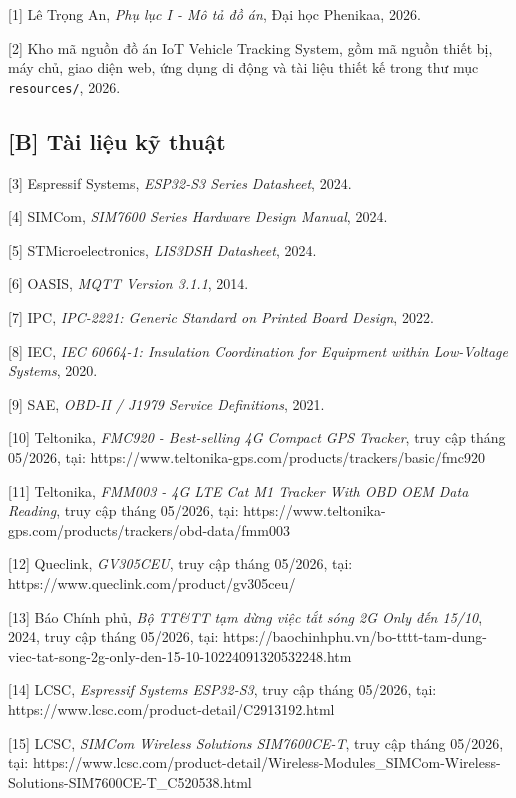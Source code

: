 \documentclass[a4paper]{extarticle}
\begin{document}
{[}1{]} Lê Trọng An, \emph{Phụ lục I - Mô tả đồ án}, Đại học Phenikaa, 2026.

{[}2{]} Kho mã nguồn đồ án IoT Vehicle Tracking System, gồm mã nguồn thiết bị, máy chủ, giao diện web, ứng dụng di động và tài liệu thiết kế trong thư mục \texttt{resources/}, 2026.

\subsection{{[}B{]} Tài liệu kỹ thuật}\label{b-tuxe0i-liux1ec7u-kux1ef9-thuux1eadt}

{[}3{]} Espressif Systems, \emph{ESP32-S3 Series Datasheet}, 2024.

{[}4{]} SIMCom, \emph{SIM7600 Series Hardware Design Manual}, 2024.

{[}5{]} STMicroelectronics, \emph{LIS3DSH Datasheet}, 2024.

{[}6{]} OASIS, \emph{MQTT Version 3.1.1}, 2014.

{[}7{]} IPC, \emph{IPC-2221: Generic Standard on Printed Board Design}, 2022.

{[}8{]} IEC, \emph{IEC 60664-1: Insulation Coordination for Equipment within Low-Voltage Systems}, 2020.

{[}9{]} SAE, \emph{OBD-II / J1979 Service Definitions}, 2021.

{[}10{]} Teltonika, \emph{FMC920 - Best-selling 4G Compact GPS Tracker}, truy cập tháng 05/2026, tại: https://www.teltonika-gps.com/products/trackers/basic/fmc920

{[}11{]} Teltonika, \emph{FMM003 - 4G LTE Cat M1 Tracker With OBD OEM Data Reading}, truy cập tháng 05/2026, tại: https://www.teltonika-gps.com/products/trackers/obd-data/fmm003

{[}12{]} Queclink, \emph{GV305CEU}, truy cập tháng 05/2026, tại: https://www.queclink.com/product/gv305ceu/

{[}13{]} Báo Chính phủ, \emph{Bộ TT\&TT tạm dừng việc tắt sóng 2G Only đến 15/10}, 2024, truy cập tháng 05/2026, tại: https://baochinhphu.vn/bo-tttt-tam-dung-viec-tat-song-2g-only-den-15-10-10224091320532248.htm

{[}14{]} LCSC, \emph{Espressif Systems ESP32-S3}, truy cập tháng 05/2026, tại: https://www.lcsc.com/product-detail/C2913192.html

{[}15{]} LCSC, \emph{SIMCom Wireless Solutions SIM7600CE-T}, truy cập tháng 05/2026, tại: https://www.lcsc.com/product-detail/Wireless-Modules\_SIMCom-Wireless-Solutions-SIM7600CE-T\_C520538.html
\end{document}
